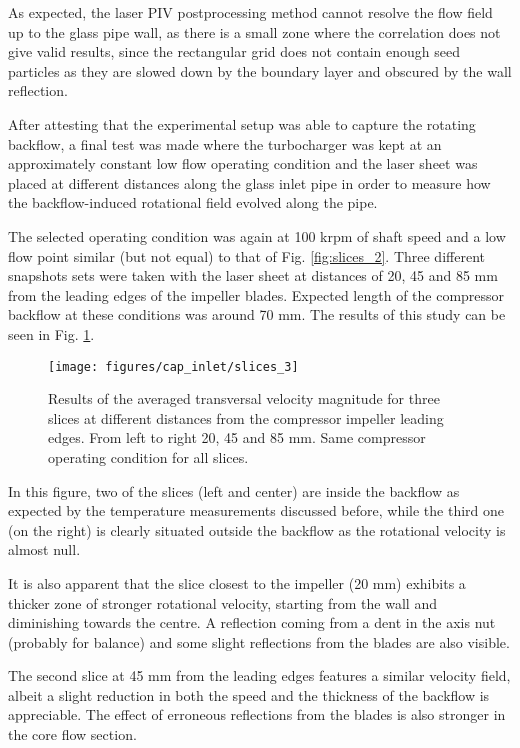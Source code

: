 As expected, the laser PIV postprocessing method cannot resolve the flow field up to the glass pipe wall, as there is a small zone where the correlation does not give valid results, since the rectangular grid does not contain enough seed particles as they are slowed down by the boundary layer and obscured by the wall reflection.

After attesting that the experimental setup was able to capture the rotating backflow, a final test was made where the turbocharger was kept at an approximately constant low flow operating condition and the laser sheet was placed at different distances along the glass inlet pipe in order to measure how the backflow-induced rotational field evolved along the pipe.

The selected operating condition was again at 100 krpm of shaft speed and a low flow point similar (but not equal) to that of Fig. \ref{fig:slices_2}. Three different snapshots sets were taken with the laser sheet at distances of 20, 45 and 85 mm from the leading edges of the impeller blades. Expected length of the compressor backflow at these conditions was around 70 mm. The results of this study can be seen in Fig. \ref{fig:slices_3}.

\begin{figure}[bt!]
\hspace{-0.1\textwidth}
\texttt{[image: figures/cap\_inlet/slices\_3]}
\caption{Results of the averaged transversal velocity magnitude for three slices at different distances from the compressor impeller leading edges. From left to right 20, 45 and 85 mm. Same compressor operating condition for all slices.}
\label{fig:slices_3}
\end{figure}

In this figure, two of the slices (left and center) are inside the backflow as expected by the temperature measurements discussed before, while the third one (on the right) is clearly situated outside the backflow as the rotational velocity is almost null.

It is also apparent that the slice closest to the impeller (20 mm) exhibits a thicker zone of stronger rotational velocity, starting from the wall and diminishing towards the centre. A reflection coming from a dent in the axis nut (probably for balance) and some slight reflections from the blades are also visible.

The second slice at 45 mm from the leading edges features a similar velocity field, albeit a slight reduction in both the speed and the thickness of the backflow is appreciable. The effect of erroneous reflections from the blades is also stronger in the core flow section.

